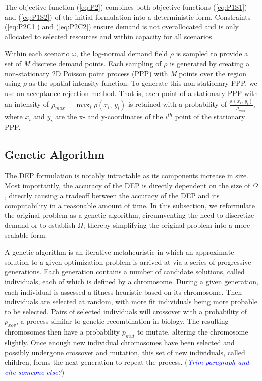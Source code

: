 \documentclass[12pt,onecolumn]{IEEEtran}
\begin{document}
The objective function (\ref{eq:P2}) combines both objective functions (\ref{eq:P1S1}) and (\ref{eq:P1S2}) of the initial formulation into a deterministic form.  Constraints (\ref{eq:P2C1}) and (\ref{eq:P2C2})	ensure demand is not overallocated and is only allocated to selected resources and within capacity for all scenarios.

Within each scenario $\omega$, the log-normal demand field $\rho$ is sampled to provide a set of \textit{M} discrete demand points.  Each sampling of $\rho$ is generated by creating a non-stationary 2D Poisson point process (PPP) with \textit{M} points over the region using $\rho$ as the spatial intensity function.  To generate this non-stationary PPP, we use an acceptance-rejection method.  That is, each point of a stationary PPP with an intensity of $\rho_{max} = \max_i\rho\left(x_i,\, y_i\right)$ is retained with a probability of $\frac{\rho\,\left(x_i,\, y_i\right)}{\rho_{max}}$, where $x_i$ and $y_i$ are the x- and y-coordinates of the $i^{th}$ point of the stationary PPP.



\subsection{Genetic Algorithm}

The DEP formulation is notably intractable as its components increase in size.  Most importantly, the accuracy of the DEP is directly dependent on the size of $\Omega$, directly causing a tradeoff between the accuracy of the DEP and its computability in a reasonable amount of time.  In this subsection, we reformulate the original problem as a genetic algorithm, circumventing the need to discretize demand or to establish $\Omega$, thereby simplifying the original problem into a more scalable form.

A genetic algorithm is an iterative metaheuristic in which an approximate solution to a given optimization problem is arrived at via a series of progressive generations.  Each generation contains a number of candidate solutions, called individuals, each of which is defined by a chromosome.  During a given generation, each individual is assessed a fitness heuristic based on its chromosome.  Then individuals are selected at random, with more fit individuals being more probable to be selected.  Pairs of selected individuals will crossover with a probability of $p_{xov}$, a process similar to genetic recombination in biology.  The resulting chromosomes then have a probability $p_{mut}$ to mutate, altering the chromosome slightly.  Once enough new individual chromosomes have been selected and possibly undergone crossover and mutation, this set of new individuals, called children, forms the next generation to repeat the process. (\textcolor{blue}{\textit{Trim paragraph and cite someone else?}})
\end{document}
